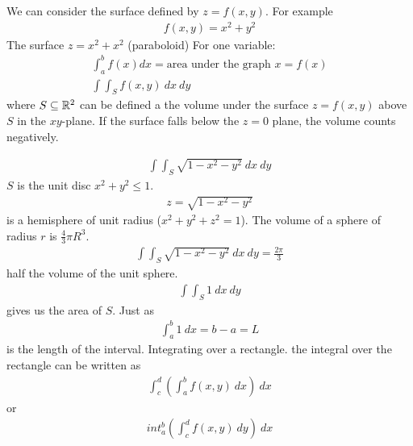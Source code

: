 We can consider the surface defined by $z = f(x,y)$.
For example
\begin{align*}
f(x,y) = x^2 + y^2 
\end{align*}
The surface $z = x^2 +x^2$ (paraboloid)
For one variable:
\begin{align*}
\int_a^b f(x) dx = \text{area under the graph } x=f(x) \\
\int \int_S f(x,y) ~dx~dy 
\end{align*}
where $S \subseteq \mathbb R^2$ can be defined a the volume under the surface $ z = f(x,y)$ above $S$ in the $xy$-plane. If the surface falls below the $z=0$ plane, the volume counts negatively.
\begin{ex}
	\begin{align*}
	\int \int_S \sqrt{1-x^2-y^2} ~dx~dy
	\end{align*}
	$S$ is the unit disc $x^2 + y^2 \le 1$.
	\begin{align*}
	z = \sqrt{1-x^2-y^2}
	\end{align*}
	is a hemisphere of unit radius ($x^2+y^2+z^2=1$). The volume of a sphere of radius $r$ is $\frac 4 3 \pi R^3$.
	\begin{align*}
	\int \int_S \sqrt{1-x^2-y^2} ~dx ~dy = \frac{2 \pi} 3
	\end{align*}
	half the volume of the unit sphere.
	\begin{align*}
	\int \int_S 1 ~dx ~dy
	\end{align*}
	gives us the area of $S$. Just as
	\begin{align*}
	\int_a^b 1 ~dx = b-a = L
	\end{align*}
	is the length of the interval. Integrating over a rectangle. the integral over the rectangle can be written as 
	\begin{align*}
	\int_c^d \left(\int_a^b f(x,y) ~dx\right) ~dx
	\end{align*}
	or
	\begin{align*}
	int_a^b \left( \int_c^d f(x,y) ~dy \right) ~dx
	\end{align*}
\end{ex}

